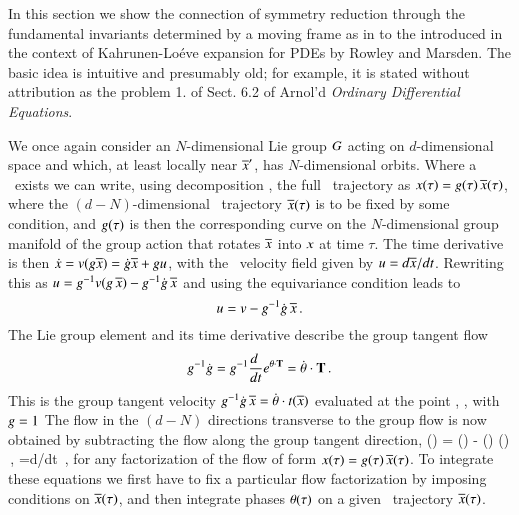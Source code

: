 In this section we show the connection of symmetry reduction through the
fundamental invariants determined  by a moving frame as in 
to the \emph{\mframes} introduced in the context of Kahrunen-Lo\'eve
expansion for PDEs by Rowley and Marsden.
The basic idea is intuitive and presumably old; for example, it is stated
without attribution as the problem 1. of Sect. 6.2 of Arnol'd
{\em Ordinary Differential Equations}.

We once again consider an $N$-dimensional Lie group $G$ acting on $d$-dimensional
space and which, at least locally near ${\overline{x}'}$, has $N$-dimensional orbits.
Where a \slice\ exists we can write, using decomposition , the full \statesp\
trajectory as $x(\tau)= g(\tau)\,\overline{x}(\tau)$, where the
$(d\!-\!N)$-dim\-ens\-ion\-al \reducedsp\ trajectory $\overline{x}(\tau)$
is to be fixed by some condition, and $g(\tau)$ is then the
corresponding curve on the $N$-dim\-ens\-ion\-al group manifold of
the group action that rotates $\overline{x}$ into $x$ at time
$\tau$. The time derivative is then $\dot{x}=
v(g\overline{x}) = \dot{g}\overline{x} + gu$,
with the \reducedsp\ velocity field given by
$u={d\overline{x}}/{dt}$. Rewriting this as $
u = g^{-1} v(g \, \overline{x})
          - g^{-1} \dot{g} \, \overline{x}
$ and using the equivariance condition 
leads to
\[
u = v - g^{-1} \dot{g} \, \overline{x}
\,.
\]
The Lie group element  and its time
derivative describe the group tangent flow
\[
g^{-1} \dot{g} =
g^{-1}\frac{d~}{dt} e^{{\bf \theta} \cdot \mathbf{T} } =
\dot{{\bf \theta}} \cdot \mathbf{T}
\,.
\]
This is the group tangent velocity $g^{-1} \dot{g}
\, \overline{x} = \dot{{\bf \theta}} \cdot t(\overline{x})$
evaluated at the point \sspRed, \ie, with ${g} = 1$
 The flow in the $(d\!-\!N)$
directions transverse to the group flow is now obtained by
subtracting the flow along the group tangent direction,
\beq
\velRed(\sspRed) = \vel(\sspRed)
      - \dot{\gSpace}(\sspRed) \cdot \groupTan(\sspRed)
\,,\qquad
\velRed={d\sspRed}/{dt}
\,,
for any factorization of the flow of form $x(\tau)=
g(\tau)\, \overline{x}(\tau)$. To integrate these equations we
first have to fix a particular flow factorization by imposing
conditions on $\overline{x}(\tau)$, and then integrate phases
${\bf \theta}(\tau)$ on a given \reducedsp\ trajectory
$\overline{x}(\tau)$.

